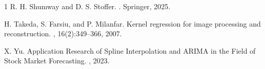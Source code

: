 \documentclass[preprint]{elsarticle}       %
\theoremstyle{plain}
\theoremstyle{remark}
\begin{document}
{\begin{thebibliography}{1}
	R. H. Shumway and D. S. Stoffer.
	.
	\newblock Springer, 2025.
    
	H. Takeda, S. Farsiu, and P. Milanfar.
	\newblock Kernel regression for image processing and reconstruction.
	, 16(2):349--366, 2007.

	X. Yu.
	\newblock Application Research of Spline Interpolation and ARIMA in the Field of Stock Market Forecasting.
	, 2023.
    
\end{thebibliography}
}
\end{document}
